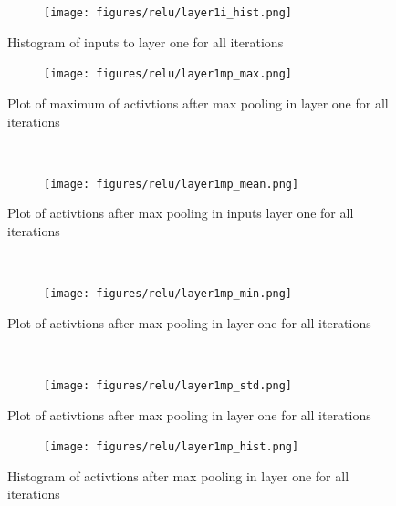 \documentclass[]{article}
\begin{document}
\begin{figure}
    \centering
    \begin{subfigure}
        \centering
        \texttt{[image: figures/relu/layer1i\_hist.png]}
    \end{subfigure}%
    \caption{Histogram of inputs to layer one for all iterations}
 \label{fig:/layer1i_hist}
\end{figure}



\begin{figure}[ht]
    \centering
    \begin{subfigure}
        \centering
        \texttt{[image: figures/relu/layer1mp\_max.png]}
    \end{subfigure}%
    \caption{Plot of maximum of activtions after max pooling in layer one for all iterations}
 \label{fig:/layer1mp_max}
    ~ 
    \centering
    \begin{subfigure}
        \centering
        \texttt{[image: figures/relu/layer1mp\_mean.png]}
    \end{subfigure}%
    \caption{Plot of activtions after max pooling in inputs layer one for all iterations}
 \label{fig:/layer1mp_mean}
    ~ 
    \centering
    \begin{subfigure}
        \centering
        \texttt{[image: figures/relu/layer1mp\_min.png]}
    \end{subfigure}%
    \caption{Plot of activtions after max pooling in layer one for all iterations}
 \label{fig:/layer1mp_min}
    ~ 
    \centering
    \begin{subfigure}
        \centering
        \texttt{[image: figures/relu/layer1mp\_std.png]}
    \end{subfigure}%
    \caption{Plot of activtions after max pooling in layer one for all iterations}
 \label{fig:/layer1mp_std}
\end{figure}

\begin{figure}
    \centering
    \begin{subfigure}
        \centering
        \texttt{[image: figures/relu/layer1mp\_hist.png]}
    \end{subfigure}%
    \caption{Histogram of activtions after max pooling in layer one for all iterations}
 \label{fig:/layer1mp_hist}
\end{figure}
\end{document}
